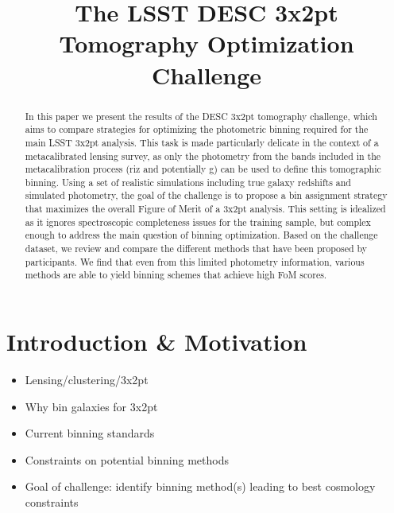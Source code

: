 \documentclass[twocolumn,twocolappendix]{aastex63}
\begin{document}
\title{The LSST DESC 3x2pt Tomography Optimization Challenge}


\begin{abstract}
In this paper we present the results of the DESC 3x2pt tomography challenge, which aims to compare strategies for optimizing the photometric binning required for the main LSST 3x2pt analysis. This task is made particularly delicate in the context of a metacalibrated lensing survey, as only the photometry from the bands  included in the metacalibration process (riz and potentially g) can be used to define this tomographic binning. Using a set of realistic simulations including true galaxy redshifts and simulated photometry, the goal of the challenge is to propose a bin assignment strategy that maximizes the overall Figure of Merit of a 3x2pt analysis. This setting is idealized as it ignores spectroscopic completeness  issues for the training sample, but complex enough to address the main question of binning optimization. Based on the challenge dataset, we review and compare the different methods that have been proposed by participants. We find that even from this limited photometry information, various methods are able to yield binning schemes that achieve high FoM scores.
\end{abstract}





\section{Introduction \& Motivation}

\begin{itemize}
    \item Lensing/clustering/3x2pt 
    \item Why bin galaxies for 3x2pt
    \item Current binning standards
    \item Constraints on potential binning methods
    \item Goal of challenge: identify binning method(s) leading to best cosmology constraints 
\end{itemize}
\end{document}
